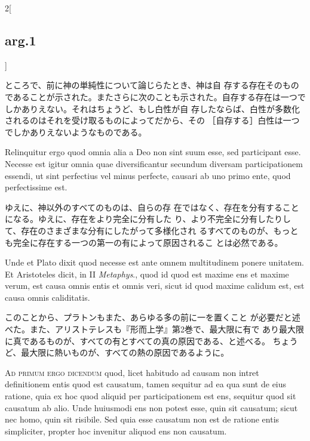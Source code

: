 \documentclass[paper=a4paper,fontsize=10pt,jafontsize=9pt,titlepage]{jlreq}
\begin{document}
\begin{paracol}{2}[\subsection{arg.1}]
\switchcolumn

ところで、前に神の単純性について論じらたとき、神は自
存する存在そのものであることが示された。またさらに次のことも示された。自存する存在は一つでしかありえない。それはちょうど、もし白性が自
存したならば、白性が多数化されるのはそれを受け取るものによってだから、その
［自存する］白性は一つでしかありえないようなものである。

\switchcolumn*

Relinquitur ergo
 quod omnia alia a Deo non sint suum esse, sed participant esse. Necesse
 est igitur omnia quae diversificantur secundum diversam participationem
 essendi, ut sint perfectius vel minus perfecte, causari ab uno primo
 ente, quod perfectissime est.

\switchcolumn

ゆえに、神以外のすべてのものは、自らの存
在ではなく、存在を分有することになる。ゆえに、存在をより完全に分有した
り、より不完全に分有したりして、存在のさまざまな分有にしたがって多様化され
るすべてのものが、もっとも完全に存在する一つの第一の有によって原因されるこ
とは必然である。

\switchcolumn*

Unde et Plato dixit quod necesse est ante
 omnem multitudinem ponere unitatem. Et Aristoteles dicit, in II
{\itshape Metaphys}., quod id quod est maxime ens et maxime verum, est causa omnis
 entis et omnis veri, sicut id quod maxime calidum est, est causa omnis
 caliditatis.

\switchcolumn

このことから、プラトンもまた、あらゆる多の前に一を置くこと
が必要だと述べた。また、アリストテレスも『形而上学』第2巻で、最大限に有で
あり最大限に真であるものが、すべての有とすべての真の原因である、と述べる。
ちょうど、最大限に熱いものが、すべての熱の原因であるように。

\switchcolumn*[\subsection{ad.1}]

{\scshape Ad primum ergo dicendum} quod, licet habitudo ad causam non intret
 definitionem entis quod est causatum, tamen sequitur ad ea qua sunt de
 eius ratione, quia ex hoc quod aliquid per participationem est ens,
 sequitur quod sit causatum ab alio. Unde huiusmodi ens non potest esse,
 quin sit causatum; sicut nec homo, quin sit risibile. Sed quia esse
 causatum non est de ratione entis simpliciter, propter hoc invenitur
 aliquod ens non causatum.


\end{paracol}
\end{document}
